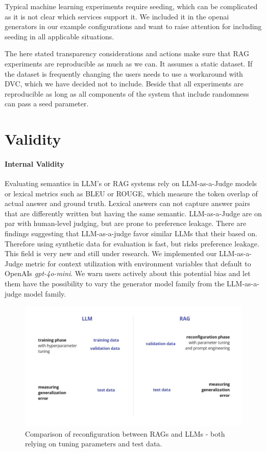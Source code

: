Typical machine learning experiments require seeding, which can be complicated as it is not clear which services support it. We included it in the openai generators in our example configurations and want to raise attention for including seeding in all applicable situations.

The here stated transparency considerations and actions make sure that RAG experiments are reproducible as much as we can. It assumes a static dataset. If the dataset is frequently changing the users needs to use a workaround with DVC, which we have decided not to include.
Beside that all experiments are reproducible as long as all components of the system that include randomness can pass a seed parameter.

\section{Validity}

\paragraph{Internal Validity}
Evaluating semantics in LLM's or RAG systems rely on LLM-as-a-Judge models or lexical metrics such as BLEU or ROUGE, which measure the token overlap of actual answer and ground truth. Lexical answers can not capture answer pairs that are differently written but having the same semantic. LLM-as-a-Judge are on par with human-level judging, but are prone to preference leakage. There are findings suggesting that LLM-as-a-judge favor similar LLMs that their based on. Therefore using synthetic data for evaluation is fast, but risks preference leakage.\cite{Li.03.02.2025} This field is very new and still under research. We implemented our LLM-as-a-Judge metric for context utilization with environment variables that default to OpenAIs \textit{gpt-4o-mini}\cite{OpenAI_2022}. We warn users actively about this potential bias and let them have the possibility to vary the generator model family from the LLM-as-a-judge model family.

\begin{figure}
    \centering
    \includegraphics[width=\textwidth]{images/RAGvsLLM-tuning.pdf}
    \caption{Comparison of reconfiguration between RAGs and LLMs - both relying on tuning parameters and test data.}
    \label{fig:tuning}
\end{figure}

